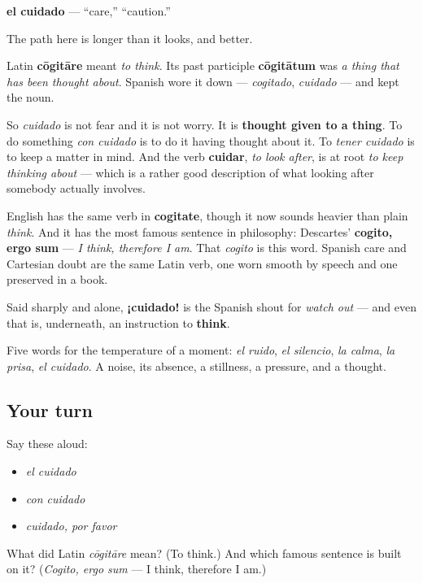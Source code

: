 \begin{cousinweb}
\textbf{el cuidado} — \textquotedblleft{}care,\textquotedblright{} \textquotedblleft{}caution.\textquotedblright{}

The path here is longer than it looks, and better.

Latin \textbf{cōgitāre} meant \emph{to think}. Its past participle \textbf{cōgitātum} was \emph{a thing that has been thought about}. Spanish wore it down — \emph{cogitado}, \emph{cuidado} — and kept the noun.

So \emph{cuidado} is not fear and it is not worry. It is \textbf{thought given to a thing}. To do something \emph{con cuidado} is to do it having thought about it. To \emph{tener cuidado} is to keep a matter in mind. And the verb \textbf{cuidar}, \emph{to look after}, is at root \emph{to keep thinking about} — which is a rather good description of what looking after somebody actually involves.

English has the same verb in \textbf{cogitate}, though it now sounds heavier than plain \emph{think}. And it has the most famous sentence in philosophy: Descartes' \textbf{cogito, ergo sum} — \emph{I think, therefore I am}. That \emph{cogito} is this word. Spanish care and Cartesian doubt are the same Latin verb, one worn smooth by speech and one preserved in a book.

Said sharply and alone, \textbf{¡cuidado!} is the Spanish shout for \emph{watch out} — and even that is, underneath, an instruction to \textbf{think}.
\end{cousinweb}

\begin{grammarlens}[title={What you've built}]
Five words for the temperature of a moment: \emph{el ruido}, \emph{el silencio}, \emph{la calma}, \emph{la prisa}, \emph{el cuidado}. A noise, its absence, a stillness, a pressure, and a thought.
\end{grammarlens}

\subsection*{Your turn}
Say these aloud:

\begin{itemize}
\raggedright
  \item \emph{el cuidado}
  \item \emph{con cuidado}
  \item \emph{cuidado, por favor}
\end{itemize}

\begin{tcolorbox}[breakable,colback=teal!4,colframe=teal!35!black,title={Before you move on}]
What did Latin \emph{cōgitāre} mean? (To think.) And which famous sentence is built on it? (\emph{Cogito, ergo sum} — I think, therefore I am.)
\end{tcolorbox}
